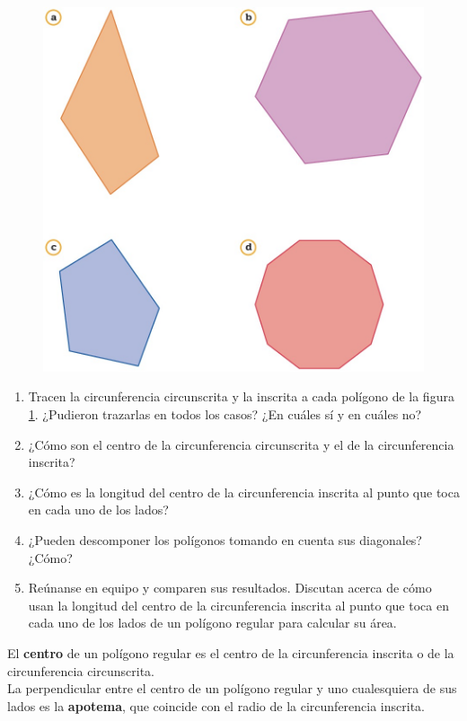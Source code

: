 \documentclass[11pt]{book}
\begin{document}
\begin{enumerate}
        \begin{figure}[H]
          \centering
          \includegraphics[width=.6\linewidth]{09.jpg}
          \label{fig:09}
        \end{figure}

        \begin{enumerate}
          \item Tracen la circunferencia circunscrita y la inscrita a cada polígono de la figura \ref{fig:09}. ¿Pudieron trazarlas en todos los casos? ¿En cuáles sí y en cuáles no?
          \item ¿Cómo son el centro de la circunferencia circunscrita y el de la circunferencia inscrita?
          \item ¿Cómo es la longitud del centro de la circunferencia inscrita al punto que toca en cada uno de los lados?
          \item ¿Pueden descomponer los polígonos tomando en cuenta sus diagonales? ¿Cómo?
          \item Reúnanse en equipo y comparen sus resultados. Discutan acerca de cómo usan la longitud del centro de la circunferencia inscrita al punto que toca en cada uno de los lados de un polígono regular para calcular su área.
        \end{enumerate}

        \begin{boxH}
          El \textbf{centro} de un polígono regular es el centro de la circunferencia inscrita o de la circunferencia circunscrita.\\
          La perpendicular entre el centro de un polígono regular y uno cualesquiera de sus lados es la \textbf{apotema}, que coincide con el radio de la circunferencia inscrita.
        \end{boxH}


\end{enumerate}
\end{document}
